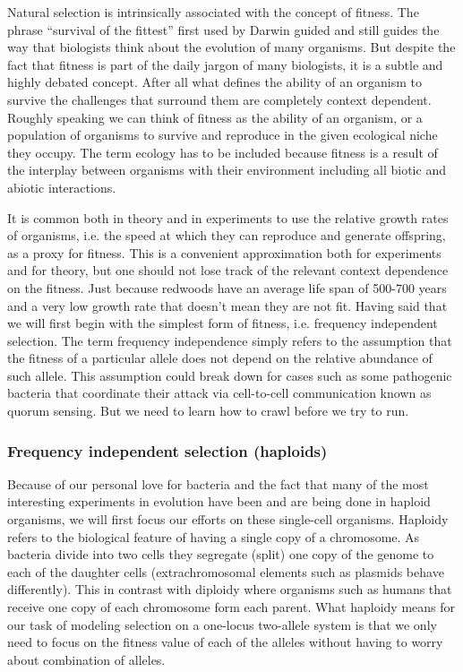 Natural selection is intrinsically associated with the concept of fitness. The
phrase ``survival of the fittest'' first used by Darwin guided and still guides
the way that biologists think about the evolution of many organisms. But
despite the fact that fitness is part of the daily jargon of many biologists,
it is a subtle and highly debated concept. After all what defines the ability
of an organism to survive the challenges that surround them are completely
context dependent. Roughly speaking we can think of fitness as the ability of
an organism, or a population of organisms to survive and reproduce in the given
ecological niche they occupy. The term ecology has to be included because
fitness is a result of the interplay between organisms with their environment
including all biotic and abiotic interactions. 

It is common both in theory and in experiments to use the relative growth rates
of organisms, i.e. the speed at which they can reproduce and generate
offspring, as a proxy for fitness. This is a convenient approximation both
for experiments and for theory, but one should not lose track of the relevant
context dependence on the fitness. Just because redwoods have an average life
span of 500-700 years and a very low growth rate that doesn't mean they are not
fit. Having said that we will first begin with the simplest form of fitness,
i.e. frequency independent selection. The term frequency independence simply
refers to the assumption that the fitness of a particular allele does not
depend on the relative abundance of such allele. This assumption could break
down for cases such as some pathogenic bacteria that coordinate their attack
via cell-to-cell communication known as quorum sensing. But we need to learn
how to crawl before we try to run.

\subsubsection{Frequency independent selection (haploids)}

Because of our personal love for bacteria and the fact that many of the most
interesting experiments in evolution have been and are being done in haploid
organisms, we will first focus our efforts on these single-cell organisms.
Haploidy refers to the biological feature of having a single copy of a
chromosome. As bacteria divide into two cells they segregate (split) one copy
of the genome to each of the daughter cells (extrachromosomal elements such as
plasmids behave differently). This in contrast with diploidy where organisms
such as humans that receive one copy of each chromosome form each parent. What
haploidy means for our task of modeling selection on a one-locus two-allele
system is that we only need to focus on the fitness value of each of the
alleles without having to worry about combination of alleles.

